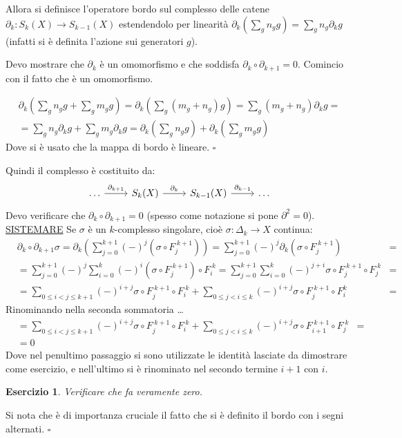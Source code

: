 \documentclass[10pt, twoside=false, x11names]{scrbook}
\newcounter{exercises}
\newtheorem{exercise}[exercises]{Esercizio}
\newenvironment{proof}{{\textbf{Dimostrazione}:}}{\hfill $\square$}
\begin{document}
Allora si definisce l'operatore bordo sul complesso delle catene $ \partial_k: S_k(X) \to S_{k-1}(X) $ estendendolo per linearità
$ \partial_k \left( \sum_g n_g g\right) = \sum_g n_g \partial_k g $ (infatti si è definita l'azione sui generatori $ g $).

Devo mostrare che $ \partial_k $ è un omomorfismo e che soddisfa $ \partial_k \circ \partial_{k+1} = 0 $. Comincio con il fatto che è un omomorfismo.

\begin{proof}
  \begin{gather*}
    \partial_k \left( \sum_g n_g g + \sum_g m_g g\right) = \partial_k \left( \sum_g(m_g + n_g)g \right) = \sum_g (m_g + n_g) \partial_k g = \\
    = \sum_g n_g \partial_k g + \sum_g m_g \partial_k g = \partial_k \left( \sum_g n_g g\right) + \partial_k \left( \sum_g m_g g \right)
  \end{gather*}
  Dove si è usato che la mappa di bordo è lineare.
\end{proof}

Quindi il complesso è costituito da:
\[
  \begin{tikzcd}
   \dots \arrow{r}{\partial_{k+1}} & S_k(X) \arrow{r}{\partial_k} & S_{k-1}(X) \arrow{r}{\partial_{k-1}} & \dots
  \end{tikzcd}
\]
Devo verificare che $ \partial_k \circ \partial_{k+1} = 0 $ (spesso come notazione si pone $ \partial^2 = 0 $).
\underline{SISTEMARE}
\begin{proof}
  Se $ \sigma $ è un $ k $-complesso singolare, cioè $ \sigma : \Delta_k \to X $ continua:
  \begin{align*}
    & \partial_k \circ \partial_{k+1} \sigma = \partial_k \left( \sum_{j=0}^{k+1}(-)^j (\sigma \circ F_j^{\; k+1}) \right) =  \sum_{j=0}^{k+1}(-)^j \partial_k (\sigma \circ F_j^{\; k+1}) &= \\
                    & = \sum_{j=0}^{k+1} (-)^j \sum_{i=0}^k (-)^i (\sigma \circ F_j^{\; k+1}) \circ F_i^{\; k} = \sum_{j = 0}^{k+1} \sum_{i = 0}^{k} (-)^{j+i} \sigma \circ F_j^{\; k+1} \circ F_{j}^{\; k} &= \\
    & = \sum_{0 \leq i < j \leq k + 1} (-)^{i+j} \sigma \circ F_j^{\; k+1} \circ F_i^{\; k} + \sum_{0 \leq j < i \leq k} (-)^{i+j} \sigma \circ F_j^{\; k+1} \circ F_i^k &=
  \end{align*}
  Rinominando nella seconda sommatoria \dots
  \begin{align*}
    & = \sum_{0 \leq i < j \leq k + 1} (-)^{i+j} \sigma \circ F_j^{\; k+1} \circ F_i^{\; k} + \sum_{0 \leq j < i \leq k} (-)^{i+j} \sigma \circ F_{i+1}^{\; k+1} \circ F_j^{\; k} & =  \\
    & = 0
  \end{align*}
  Dove nel penultimo passaggio si sono utilizzate le identità lasciate da dimostrare come esercizio,
  e nell'ultimo si è rinominato nel secondo termine $ i + 1 $ con $ i $.
  \begin{exercise}
    Verificare che fa veramente zero.
  \end{exercise}
  Si nota che è di importanza cruciale il fatto che si è definito il bordo con i segni alternati.
\end{proof}
\end{document}
